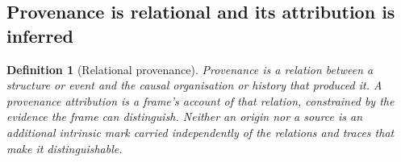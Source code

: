 \documentclass[11pt,a4paper]{article}
\newtheorem{definition}{Definition}[section]
\theoremstyle{remark}\newtheorem{remark}[definition]{Remark}
\begin{document}
\subsection{Provenance is relational and its attribution is inferred}\label{sec:provenance-principle}

\begin{definition}[Relational provenance]\label{def:provenance}
Provenance is a relation between a structure or event and the causal
organisation or history that produced it. A provenance attribution is a
frame's account of that relation, constrained by the evidence the frame
can distinguish. Neither an origin nor a source is an additional intrinsic
mark carried independently of the relations and traces that make it
distinguishable.
\end{definition}
\end{document}
